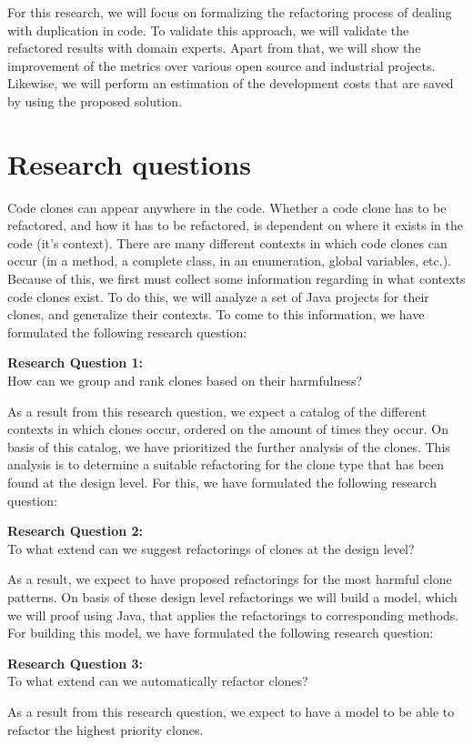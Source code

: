 \documentclass{report}
\theoremstyle{definition}
\theoremstyle{remark}
\begin{document}
For this research, we will focus on formalizing the refactoring process of dealing with duplication in code. To validate this approach, we will validate the refactored results with domain experts. Apart from that, we will show the improvement of the metrics over various open source and industrial projects. Likewise, we will perform an estimation of the development costs that are saved by using the proposed solution.

\section{Research questions}
Code clones can appear anywhere in the code. Whether a code clone has to be refactored, and how it has to be refactored, is dependent on where it exists in the code (it's context). There are many different contexts in which code clones can occur (in a method, a complete class, in an enumeration, global variables, etc.). Because of this, we first must collect some information regarding in what contexts code clones exist. To do this, we will analyze a set of Java projects for their clones, and generalize their contexts. To come to this information, we have formulated the following research question:
\begin{displayquote}
\textbf{Research Question 1:}\\How can we group and rank clones based on their harmfulness?
\end{displayquote}
As a result from this research question, we expect a catalog of the different contexts in which clones occur, ordered on the amount of times they occur. On basis of this catalog, we have prioritized the further analysis of the clones. This analysis is to determine a suitable refactoring for the clone type that has been found at the design level. For this, we have formulated the following research question:
\begin{displayquote}
\textbf{Research Question 2:}\\To what extend can we suggest refactorings of clones at the design level?
\end{displayquote}
As a result, we expect to have proposed refactorings for the most harmful clone patterns. On basis of these design level refactorings we will build a model, which we will proof using Java, that applies the refactorings to corresponding methods. For building this model, we have formulated the following research question:
\begin{displayquote}
\textbf{Research Question 3:}\\To what extend can we automatically refactor clones?
\end{displayquote}
As a result from this research question, we expect to have a model to be able to refactor the highest priority clones.
\end{document}
